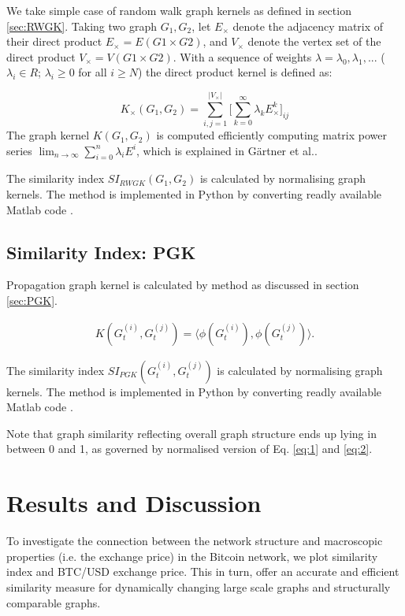 We take simple case of random walk graph kernels as defined in section \ref{sec:RWGK}. Taking two graph $G_{1}, G_{2}$, let $E_{\times}$ denote the adjacency matrix of their direct product $E_{\times} = E (G1 \times G2) $, and $V_{\times}$ denote the vertex set of the direct product  $V_{\times} = V (G1 \times G2) $. With a sequence of weights $\lambda = \lambda_{0}, \lambda_{1},...$
($\lambda_{i} \in R$; $\lambda_{i} \geq 0$ for all $i \geq N$) the direct product kernel is defined as:

%
\begin{equation}
K_{\times} (G_{1}, G_{2}) = \displaystyle\sum_{i,j=1}^{| V_{\times} |} \Bigg[ \displaystyle\sum_{k=0}^{\infty} \lambda_{k}E_{\times}^{k} \Bigg]_{ij}
\label{eq:1}
\end{equation}
%
The graph kernel $K(G_{1}, G_{2})$ is computed efficiently computing matrix power series $\lim_{n \to \infty} \sum_{i=0}^{n} \lambda_{i}E^{i}$, which is explained in  G{\"a}rtner et al.\citep{Gartner2003}.

The similarity index $SI_{RWGK}(G_{1}, G_{2})$ is calculated by normalising graph kernels. The method is implemented in Python by converting readly available Matlab code \citep{Kashima2003}.

\subsection{Similarity Index: PGK }

Propagation graph kernel is calculated by method as discussed in section \ref{sec:PGK}.

\begin{align}
 K(G^{(i)}_t, G^{(j)}_t) = \langle\phi(G^{(i)}_t),\phi(G^{(j)}_t)\rangle.
\label{eq:2}
\end{align}

The similarity index $SI_{PGK}(G^{(i)}_t, G^{(j)}_t)$ is calculated by normalising graph kernels. The method is implemented in Python by converting readly available Matlab code \citep{Neumann2015}.

Note that graph similarity reflecting overall graph structure
ends up lying in between 0 and 1, as governed by normalised version of Eq. \ref{eq:1} and \ref{eq:2}.

\section{Results and Discussion}

To investigate the connection between the network structure and
macroscopic properties (i.e. the exchange price) in the Bitcoin network, we plot similarity index and BTC/USD exchange price. This in turn, offer an accurate and efficient similarity measure for dynamically changing large scale graphs and structurally comparable graphs. 

